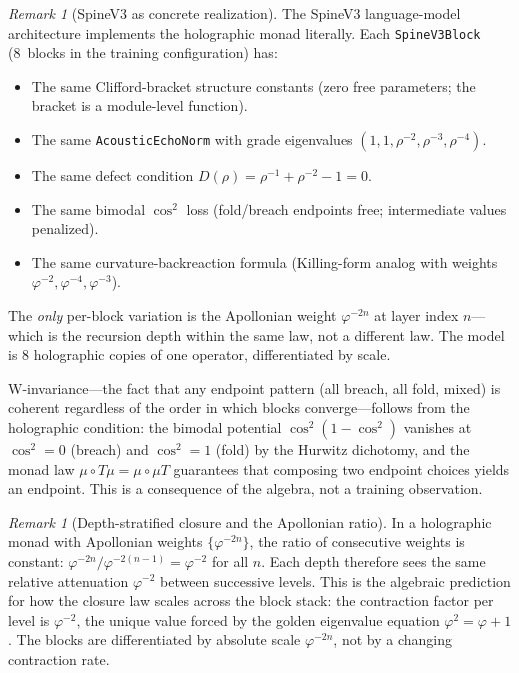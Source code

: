 \documentclass[11pt,a4paper]{article}
\theoremstyle{plain}
\theoremstyle{definition}
\theoremstyle{remark}
\newtheorem{remark}[theorem]{Remark}
\numberwithin{equation}{section}
\providecommand{\vp}{\varphi}
\begin{document}
\begin{remark}[SpineV3 as concrete realization]
\label{rmk:spinev3}
The SpineV3 language-model architecture
\cite{spine-v3} implements the holographic monad literally.
Each \texttt{SpineV3Block} (8~blocks in the training
configuration) has:
\begin{itemize}[nosep]
  \item The same Clifford-bracket structure constants (zero
    free parameters; the bracket is a module-level function).
  \item The same \texttt{AcousticEchoNorm} with grade eigenvalues
    $(1, 1, \rho^{-2}, \rho^{-3}, \rho^{-4})$.
  \item The same defect condition $D(\rho) = \rho^{-1} +
    \rho^{-2} - 1 = 0$.
  \item The same bimodal $\cos^2$ loss (fold/breach endpoints
    free; intermediate values penalized).
  \item The same curvature-backreaction formula (Killing-form
    analog with weights $\vp^{-2}, \vp^{-4}, \vp^{-3}$).
\end{itemize}
The \emph{only} per-block variation is the Apollonian weight
$\vp^{-2n}$ at layer index $n$---which is the recursion depth
within the same law, not a different law.  The model is $8$
holographic copies of one operator, differentiated by scale.
\end{remark}

W-invariance---the fact that any endpoint pattern (all breach,
all fold, mixed) is coherent regardless of the order in which
blocks converge---follows from the holographic condition: the
bimodal potential $\cos^2(1 - \cos^2)$ vanishes at $\cos^2 = 0$
(breach) and $\cos^2 = 1$ (fold) by the Hurwitz dichotomy, and
the monad law $\mu \circ T\mu = \mu \circ \mu T$ guarantees
that composing two endpoint choices yields an endpoint.  This
is a consequence of the algebra, not a training observation.

\begin{remark}[Depth-stratified closure and the Apollonian ratio]
\label{rmk:apollonian-ratio}
In a holographic monad with Apollonian weights $\{\vp^{-2n}\}$,
the ratio of consecutive weights is constant:
$\vp^{-2n}/\vp^{-2(n-1)} = \vp^{-2}$ for all $n$.  Each
depth therefore sees the same relative attenuation $\vp^{-2}$
between successive levels.  This is the algebraic prediction
for how the closure law scales across the block stack: the
contraction factor per level is $\vp^{-2}$, the unique value
forced by the golden eigenvalue equation $\vp^2 = \vp + 1$.
The blocks are differentiated by absolute scale $\vp^{-2n}$,
not by a changing contraction rate.
\end{remark}
\end{document}
